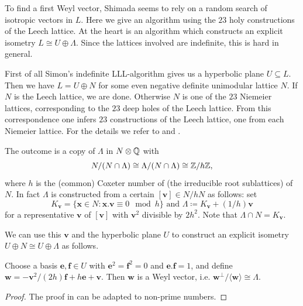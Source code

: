 \documentclass[11pt,letterpaper]{amsart}
\newcommand{\vect}[1]{\boldsymbol{#1}}
\begin{document}
To find a first Weyl vector, Shimada seems to rely on a random search of isotropic vectors in $L$. 
Here we give an algorithm using the $23$ holy constructions of the Leech lattice. 
At the heart is an algorithm which constructs an explicit isometry $L \cong U\oplus \Lambda$. Since the lattices involved are indefinite, this is hard in general.

First of all Simon's indefinite LLL-algorithm \cite{simon.lll} gives us a hyperbolic plane $U \subseteq L$. Then
we have $L = U \oplus N$ for some even negative definite unimodular lattice $N$.
If $N$ is the Leech lattice, we are done. Otherwise $N$ is one of the $23$ Niemeier lattices, corresponding to the $23$ deep holes of the Leech lattice. 
From this correspondence one infers $23$ constructions of the Leech lattice, one from each Niemeier lattice. For the details we refer to \cite[Theorem 4.4]{ebeling.lattices} and 
\cite[Chapter 24]{conway.sloane.lattices}. 

The outcome is a copy of $\Lambda$ in $N \otimes \mathbb{Q}$ with 
\[N/(N \cap \Lambda) \cong \Lambda / (N \cap \Lambda) \cong \mathbb{Z}/ h \mathbb{Z},\] 
where $h$ is the (common) Coxeter number of (the irreducible root sublattices) of $N$. In fact $\Lambda$ is constructed from a certain $[\vect{v}]\in N/hN$ as follows: set 
$$K_{\vect{v}} = \{\vect{x} \in N : \vect{x}.\vect{v} \equiv 0 \mod h\} \mbox{ and } \Lambda\coloneqq K_{\vect{v}}+(1/h)\vect{v}$$
for a representative $\vect{v}$ of $[\vect{v}]$ with $\vect{v}^2$ divisible by $2h^2$. Note that $\Lambda \cap N = K_{\vect{v}}$. 

We can use this $\vect{v}$ and the hyperbolic plane $U$ to construct an explicit isometry $U \oplus N \cong U \oplus \Lambda$ as follows.

\begin{theorem}
Choose a basis $\vect{e},\vect{f} \in U$ with $\vect{e}^2 = \vect{f}^2=0$ and $\vect{e}.\vect{f}=1$, and define $\vect{w} = -\vect{v}^2/(2h)\vect{f}+h \vect{e} + \vect{v}$. 
Then $\vect{w}$ is a Weyl vector, i.e. $\vect{w}^\perp/\langle \vect{w} \rangle \cong \Lambda$.
\end{theorem}
\begin{proof}
The proof in \cite[\S 2.1]{brandhorst.elkies} can be adapted to non-prime numbers.
\end{proof}
\end{document}
